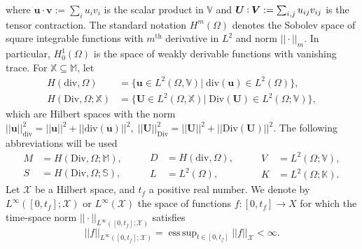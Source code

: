 \documentclass{ifacconf}
\DeclareMathOperator*{\esssup}{ess\,sup}
\def\onedot{$\mathsurround0pt\ldotp$}
\def\cddot{%
	\mathbin{\vcenter{\baselineskip.67ex
			\hbox{\onedot}\hbox{\onedot}}%
}}
\begin{document}
where $\bm{u} \cdot \bm{v} := \sum_{i} u_{i} v_{i}$ is the scalar product in $\mathbb{V}$ and $\bm{U} \cddot \bm{V} := \sum_{i,j} u_{ij} v_{ij}$ is the tensor contraction. The standard notation $H^m(\Omega)$ denotes the Sobolev space of square integrable functions with  $m^\text{th}$ derivative in $L^2$ and norm $||\cdot||_m$. In particular, $H^1_0(\Omega)$ is the space of weakly derivable functions with vanishing trace. For $\mathbb{X} \subseteq \mathbb{M}$, let
\begin{equation*}
\begin{aligned}
H(\mathrm{div}, \Omega) &= \{\bm{u} \in L^2(\Omega, \mathbb{V}) \vert \; \mathrm{div}(\bm{u}) \in L^2(\Omega) \}, \\
H(\mathrm{Div}, \Omega; \mathbb{X}) &= \{\bm{U} \in L^2(\Omega, \mathbb{X}) \vert \; \mathrm{Div}(\bm{U}) \in L^2(\Omega; \mathbb{V}) \},
\end{aligned}
\end{equation*}
which are Hilbert spaces with the norm $||\bm{u}||^2_{\text{div}} = ||\bm{u}||^2 + ||\mathrm{div}(\bm{u})||^2, \; ||\bm{U}||^2_{\text{Div}} = ||\bm{U}||^2 + ||\mathrm{Div}(\bm{U})||^2$. The following abbreviations will be used
\begin{equation*}
\begin{aligned}
M &= H(\mathrm{Div}, \Omega; \mathbb{M}), \\
S &= H(\mathrm{Div}, \Omega; \mathbb{S}),
\end{aligned} \qquad
\begin{aligned}
D &= H(\mathrm{div}, \Omega), \\
L &= L^2(\Omega),
\end{aligned} \qquad
\begin{aligned}
V &= L^2(\Omega; \mathbb{V}), \\
K &= L^2(\Omega; \mathbb{K}).
\end{aligned}
\end{equation*}
Let $\mathcal{X}$ be a Hilbert space, and $t_f$ a positive real number. We denote by $L^\infty([0, t_f]; \mathcal{X})$ or $L^\infty(\mathcal{X})$ the space of functions $f: [0, t_f] \rightarrow X$ for which the time-space norm $||\cdot||_{L^\infty([0, t_f]; \mathcal{X})}$ satisfies
\[
||f||_{L^\infty([0, t_f]; \mathcal{X})} = \esssup_{t \in [0,t_f]} ||f||_{\mathcal{X}} < \infty.
\]
\end{document}
